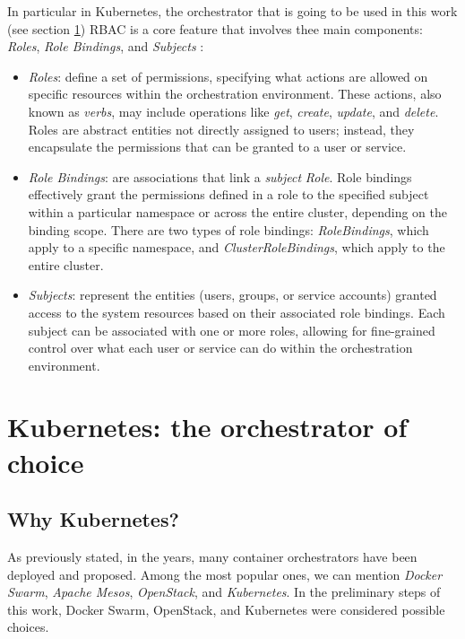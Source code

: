 In particular in Kubernetes, the orchestrator that is going to be used in this
work (see section \ref{sec:chpt1-kubernetes}) RBAC is a core feature that
involves thee main components: \textit{Roles}, \textit{Role Bindings}, and
\textit{Subjects} \cite{kdoc-rbac}:

\begin{itemize}
  \itemsep0em
   \item \textit{Roles}: define a set of permissions, specifying what actions
     are allowed on specific resources within the orchestration environment.
     These actions, also known as \textit{verbs}, may include operations like
     \textit{get},  \textit{create}, \textit{update}, and \textit{delete}.
     Roles are abstract entities not directly assigned to users; instead, they
     encapsulate the permissions that can be granted to a user or service.
   \item \textit{Role Bindings}: are associations that link a \textit{subject}
     \textit{Role}.
     Role bindings effectively grant the permissions defined in a role to the
     specified subject within a particular namespace or across the entire
     cluster, depending on the binding scope.
     There are two types of role bindings: \textit{RoleBindings}, which apply to
     a specific namespace, and \textit{ClusterRoleBindings}, which apply to the
     entire cluster.
   \item \textit{Subjects}: represent the entities (users, groups, or service
     accounts) granted access to the system resources based on their associated
     role bindings. Each subject can be associated with one or more roles,
     allowing for fine-grained control over what each user or service can do
     within the orchestration environment.
\end{itemize}

\section{Kubernetes: the orchestrator of choice}\label{sec:chpt1-kubernetes}

\subsection{Why Kubernetes?}

As previously stated, in the years, many container orchestrators have been
deployed and proposed.
Among the most popular ones, we can mention \textit{Docker Swarm},
\textit{Apache Mesos}, \textit{OpenStack}, and \textit{Kubernetes}.
In the preliminary steps of this work, Docker Swarm, OpenStack, and Kubernetes
were considered possible choices.

